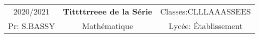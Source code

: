 \documentclass[12pt,a4paper]{report}
\begin{document}
\begin{tcolorbox}[enhanced, colback=white, frame hidden,
 underlay vignette={draw method=clipped, size=1.5mm, semi fade in=red, east size=1.5mm, south size=3mm}]
\begin{center}
 \begin{tabular}{c ||c || c}
 2020/2021  \hspace*{2.5cm}   & \textbf{{\Large  Tittttrreee de la Série  }} &  \hspace*{0.5cm} Classes:CLLLAAASSEES  \\
 Pr: S.BASSY\hspace*{2cm} &Mathématique & \hspace*{0.5cm}Lycée: Établissement 
 \end{tabular}
\end{center}
\end{tcolorbox}
\end{document}
